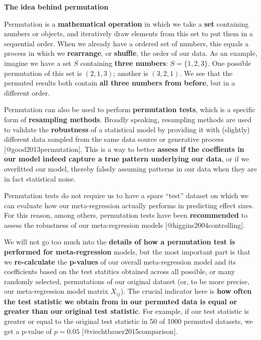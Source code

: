\documentclass[]{book}
\begin{document}
\begin{rmdinfo}
\textbf{The idea behind permutation}

Permutation is a \textbf{mathematical operation} in which we take a
\textbf{set} containing numbers or objects, and iteratively draw
elements from this set to put them in a sequential order. When we
already have a ordered set of numbers, this equals a process in which we
\textbf{rearrange}, or \textbf{shuffle}, the order of our data. As an
example, imagine we have a set \(S\) containing \textbf{three numbers}:
\(S=\{1,2,3 \}\). One possible permutation of this set is \((2,1,3)\);
another is \((3,2,1)\). We see that the permuted results both contain
\textbf{all three numbers from before}, but in a different order.

Permutation can also be used to perform \textbf{permutation tests},
which is a specific form of \textbf{resampling methods}. Broadly
speaking, resampling methods are used to validate the
\textbf{robustness} of a statistical model by providing it with
(slightly) different data sampled from the same data source or
generative process {[}@good2013permutation{]}. This is a way to better
\textbf{assess if the coeffients in our model indeed capture a true
pattern underlying our data}, or if we overfitted our model, thereby
falsely assuming patterns in our data when they are in fact statistical
noise.

Permutation tests do not require us to have a spare ``test'' dataset on
which we can evaluate how our meta-regression actually performs in
predicting effect sizes. For this reason, among others, permutation
tests have been \textbf{recommended} to assess the robustness of our
meta-regression models {[}@higgins2004controlling{]}.

We will not go too much into the \textbf{details of how a permutation
test is performed for meta-regression} models, but the most important
part is that we \textbf{re-calculate} the \textbf{p-values} of our
overall meta-regression model and its coefficients based on the test
statitics obtained across all possible, or many randomly selected,
permutations of our original dataset (or, to be more precise, our
meta-regression model matrix \(X_{ij}\)). The crucial indicator here is
\textbf{how often the test statistic we obtain from in our permuted data
is equal or greater than our original test statistic}. For example, if
our test statistic is greater or equal to the original test statistic in
50 of 1000 permuted datasets, we get a p-value of \(p=0.05\)
{[}@viechtbauer2015comparison{]}.
\end{rmdinfo}
\end{document}
